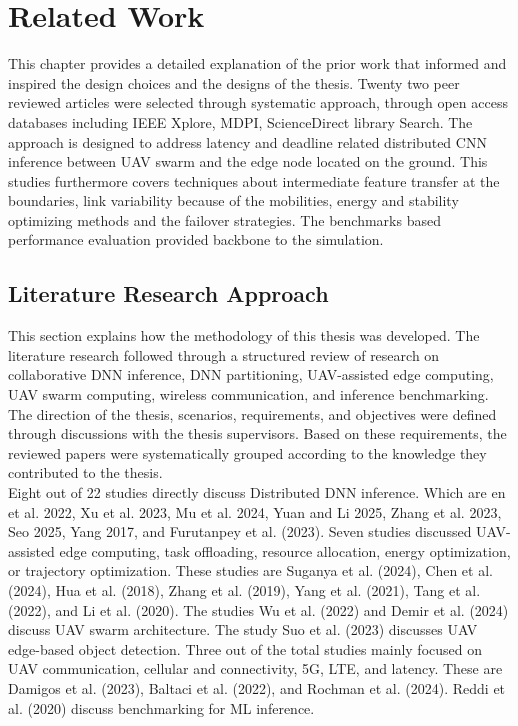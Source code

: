\chapter{Related Work} \label{related_work_chapter}
This chapter provides a detailed explanation of the prior work that informed and inspired the design choices and the designs of the thesis. Twenty two peer reviewed articles were selected through systematic approach, through open access databases including IEEE Xplore, MDPI, ScienceDirect library Search. The approach is designed to address latency and deadline related distributed CNN inference between UAV swarm and the edge node located on the ground. This studies furthermore covers techniques about intermediate feature transfer at the boundaries, link variability because of the mobilities, energy and stability optimizing methods and the failover strategies. The benchmarks based performance evaluation provided backbone to the simulation.


\section{Literature Research Approach}

This section explains how the methodology of this thesis was developed. The literature research followed through a structured review of research on collaborative DNN inference, DNN partitioning, UAV-assisted edge computing, UAV swarm computing, wireless communication, and inference benchmarking. The direction of the thesis, scenarios, requirements, and objectives were defined through discussions with the thesis supervisors.  Based on these requirements, the reviewed papers were systematically grouped according to the knowledge they contributed to the thesis. \\

Eight out of 22 studies directly discuss Distributed DNN inference. Which are en et al. 2022, Xu et al. 2023, Mu et al. 2024, Yuan and Li 2025, Zhang et al. 2023, Seo 2025, Yang 2017, and Furutanpey et al. (2023). Seven studies discussed  UAV-assisted edge computing, task offloading, resource allocation, energy optimization, or trajectory optimization.  These studies are Suganya et al. (2024), Chen et al. (2024), Hua et al. (2018), Zhang et al. (2019), Yang et al. (2021), Tang et al. (2022), and Li et al. (2020). The studies Wu et al. (2022) and Demir et al. (2024) discuss UAV swarm architecture. The study Suo et al. (2023) discusses UAV edge-based object detection. Three out of the total studies mainly focused on UAV communication, cellular and connectivity, 5G, LTE, and latency. These are Damigos et al. (2023), Baltaci et al. (2022), and Rochman et al. (2024). Reddi et al. (2020) discuss benchmarking for ML inference.   


